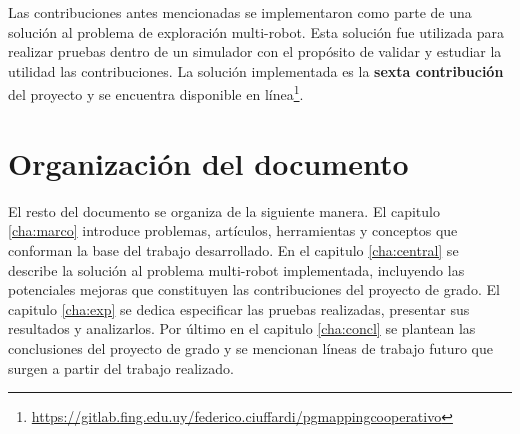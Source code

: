 


Las contribuciones antes mencionadas se implementaron como parte de una
solución al problema de exploración multi-robot. Esta solución fue utilizada para
realizar pruebas dentro de un simulador con el propósito de validar y estudiar
la utilidad las contribuciones. La solución implementada es la \textbf{sexta
contribución} del proyecto y se encuentra disponible en
línea\footnote{\url{https://gitlab.fing.edu.uy/federico.ciuffardi/pgmappingcooperativo}}.

\section{Organización del documento}
El resto del documento se organiza de la siguiente manera. El capitulo
\ref{cha:marco} introduce problemas, artículos, herramientas y conceptos que
conforman la base del trabajo desarrollado. En el capitulo \ref{cha:central} se
describe la solución al problema multi-robot implementada, incluyendo las
potenciales mejoras que constituyen las contribuciones del proyecto de grado. El
capitulo \ref{cha:exp} se dedica especificar las pruebas realizadas, presentar
sus resultados y analizarlos. Por último en el capitulo \ref{cha:concl} se
plantean las conclusiones del proyecto de grado y se mencionan líneas de
trabajo futuro que surgen a partir del trabajo realizado.


